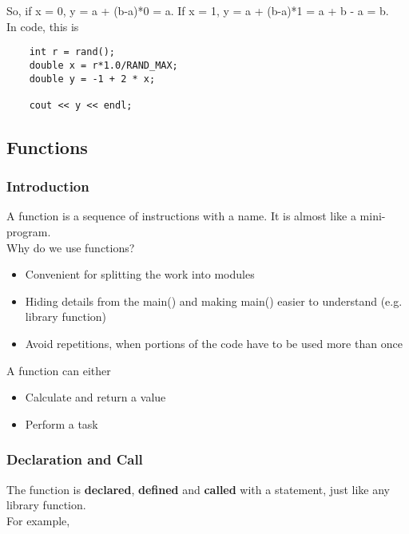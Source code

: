 \documentclass[]{article}
\begin{document}
So, if x = 0, y = a + (b-a)*0 = a. If x = 1, y = a + (b-a)*1 = a + b - a = b.\\

In code, this is

\begin{lstlisting}
	int r = rand();
	double x = r*1.0/RAND_MAX;
	double y = -1 + 2 * x;
	
	cout << y << endl;
\end{lstlisting}\bigbreak


\subsection{Functions}
\bigbreak

\subsubsection{Introduction}
\bigbreak


A function is a sequence of instructions with a name. It is almost like a mini-program.\\


Why do we use functions?

\begin{itemize}
	\item Convenient for splitting the work into modules
	\item Hiding details from the main() and making main() easier to understand (e.g. library function)
	\item Avoid repetitions, when portions of the code have to be used more than once
\end{itemize}\bigbreak

A function can either

\begin{itemize}
	\item Calculate and return a value
	\item Perform a task
\end{itemize}\bigbreak


\subsubsection{Declaration and Call}
\bigbreak

The function is \textbf{declared}, \textbf{defined} and \textbf{called} with a statement, just like any library function.\\

For example, 
\end{document}
